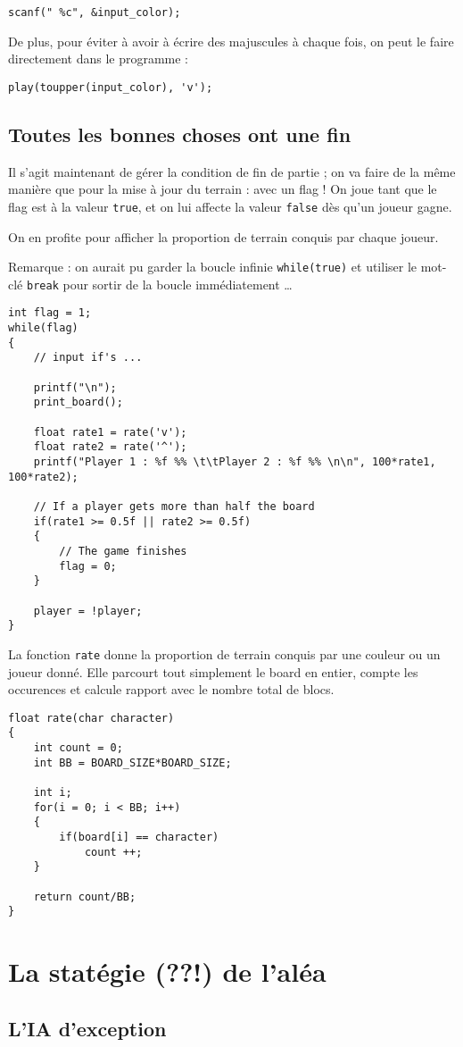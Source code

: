 \documentclass[a4paper,11pt]{article}
\begin{document}
	\begin{lstlisting}
scanf(" %c", &input_color);
	\end{lstlisting}
	
	De plus, pour éviter à avoir à écrire des majuscules à chaque fois, on peut le faire directement dans le programme :
	
	\begin{lstlisting}
play(toupper(input_color), 'v');
	\end{lstlisting}
	
	
	\subsection{Toutes les bonnes choses ont une fin}
	
	Il s'agit maintenant de gérer la condition de fin de partie ; on va faire de la même manière que pour la mise à jour du terrain : avec un flag ! On joue tant que le flag est à la valeur \texttt{true}, et on lui affecte la valeur \texttt{false} dès qu'un joueur gagne.
	
	On en profite pour afficher la proportion de terrain conquis par chaque joueur.
	
	Remarque : on aurait pu garder la boucle infinie \texttt{while(true)} et utiliser le mot-clé \texttt{break} pour sortir de la boucle immédiatement \dots
	
	\begin{lstlisting}
int flag = 1;
while(flag)
{
	// input if's ...
	
	printf("\n");
	print_board();
	
	float rate1 = rate('v');
	float rate2 = rate('^');
	printf("Player 1 : %f %% \t\tPlayer 2 : %f %% \n\n", 100*rate1, 100*rate2);
	
	// If a player gets more than half the board
	if(rate1 >= 0.5f || rate2 >= 0.5f)
	{
		// The game finishes
		flag = 0;
	}
	
	player = !player;
}
	\end{lstlisting}
	
	La fonction \texttt{rate} donne la proportion de terrain conquis par une couleur ou un joueur donné. Elle parcourt tout simplement le board en entier, compte les occurences et calcule rapport avec le nombre total de blocs.
	
	\begin{lstlisting}
float rate(char character)
{
	int count = 0;
	int BB = BOARD_SIZE*BOARD_SIZE;
	
	int i;
	for(i = 0; i < BB; i++)
	{
		if(board[i] == character)
			count ++;
	}
	
	return count/BB;
}
	\end{lstlisting}
	
	
	
	\section{La statégie (??!) de l'aléa}
	
	
	\subsection{L'IA d'exception}
	
	
	
	
	
	
	
\end{document}
